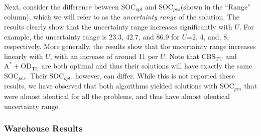 \documentclass[jair,twoside,11pt,theapa]{article}
\newcommand{\odatu}{$\mathrm{A^{*}+OD_{TU}}$\xspace}
\newcommand{\cbstu}{CBS$\mathrm{_{TU}}$\xspace}
\newcommand{\socopt}{SOC$_{opt}$\xspace}
\newcommand{\socpes}{SOC$_{pes}$\xspace}
\begin{document}
Next, consider the difference between \socopt and \socpes (shown in the ``Range'' column), 
which we will refer to as the \emph{uncertainty range} of the solution. 
The results clearly show that the uncertainty range increases significantly with $U$. 
For example, the uncertainty range is 23.3, 42.7, and 86.9 for $U$=2, 4, and, 8, respectively. 
More generally, the results show that the uncertainty range increases linearly with $U$, with an increase of around 11 per $U$.
Note that \cbstu and \odatu are both optimal and thus their solutions will have exactly the same \socpes. Their \socopt, however, can differ. 
While this is not reported these results, we have observed that both algorithms yielded solutions with \socpes that were almost identical for all the problems, and thus have almost identical uncertainty range.  


\subsubsection{Warehouse Results}
\end{document}
